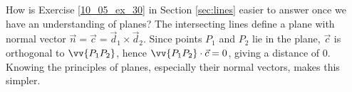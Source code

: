 {How is Exercise \ref{10_05_ex_30} in Section \ref{sec:lines} easier to answer once we have an understanding of planes?
}
{The intersecting lines define a plane with normal vector $\vec n = \vec c = \vec d_1\times \vec d_2$. Since points $P_1$ and $P_2$ lie in the plane, $\vec c$ is orthogonal to $\vv{P_1P_2}$, hence $\vv{P_1P_2}\cdot\vec c = 0$, giving a distance of 0. Knowing the principles of planes, especially their normal vectors, makes this simpler.
}


